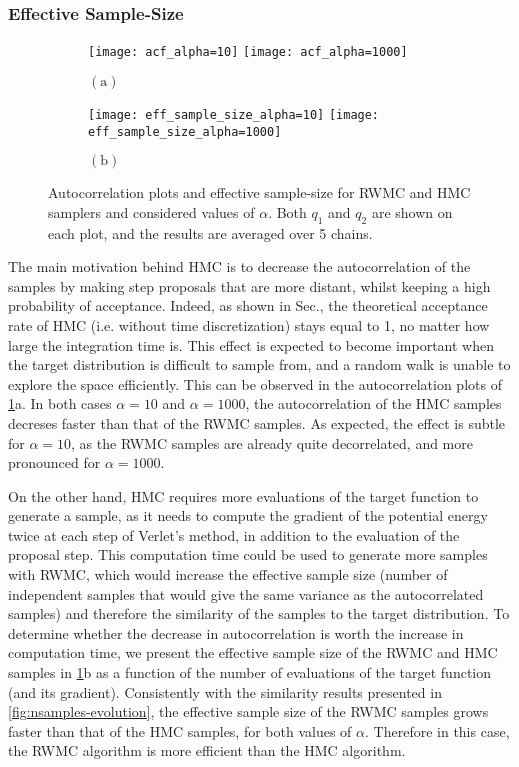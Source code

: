 \documentclass[a4paper, 12pt,oneside]{article}
\begin{document}
		\subsubsection{Effective Sample-Size}
		\begin{figure}[htb]
			\begin{subfigure}[b]{\textwidth}
				\centering
				\texttt{[image: acf\_alpha=10]}
				\texttt{[image: acf\_alpha=1000]}
				\caption*{$\mathrm{(a)}$}
			\end{subfigure}
			\begin{subfigure}[b]{\textwidth}
				\centering
				\texttt{[image: eff\_sample\_size\_alpha=10]}
				\texttt{[image: eff\_sample\_size\_alpha=1000]}
				\caption*{$\mathrm{(b)}$}
			\end{subfigure}
			\caption{Autocorrelation plots and effective sample-size for RWMC and HMC samplers and considered values of $\alpha$. Both $q_1$ and $q_2$ are shown on each plot, and the results are averaged over 5 chains.}
			\label{fig:acf-ess}
		\end{figure}
		The main motivation behind HMC is to decrease the autocorrelation of the samples by making step proposals that are more distant, whilst keeping a high probability of acceptance. Indeed, as shown in Sec., the theoretical acceptance rate of HMC (i.e. without time discretization) stays equal to 1, no matter how large the integration time is. This effect is expected to become important when the target distribution is difficult to sample from, and a random walk is unable to explore the space efficiently.
		This can be observed in the autocorrelation plots of \ref{fig:acf-ess}a. In both cases $\alpha=10$ and $\alpha=1000$, the autocorrelation of the HMC samples decreses faster than that of the RWMC samples. As expected, the effect is subtle for $\alpha=10$, as the RWMC samples are already quite decorrelated, and more pronounced for $\alpha=1000$.

		On the other hand, HMC requires more evaluations of the target function to generate a sample, as it needs to compute the gradient of the potential energy twice at each step of Verlet's method, in addition to the evaluation of the proposal step. This computation time could be used to generate more samples with RWMC, which would increase the effective sample size (number of independent samples that would give the same variance as the autocorrelated samples) and therefore the similarity of the samples to the target distribution.
		To determine whether the decrease in autocorrelation is worth the increase in computation time, we present the effective sample size of the RWMC and HMC samples in \ref{fig:acf-ess}b as a function of the number of evaluations of the target function (and its gradient).
		Consistently with the similarity results presented in \ref{fig:nsamples-evolution}, the effective sample size of the RWMC samples grows faster than that of the HMC samples, for both values of $\alpha$. Therefore in this case, the RWMC algorithm is more efficient than the HMC algorithm.
		
\end{document}
